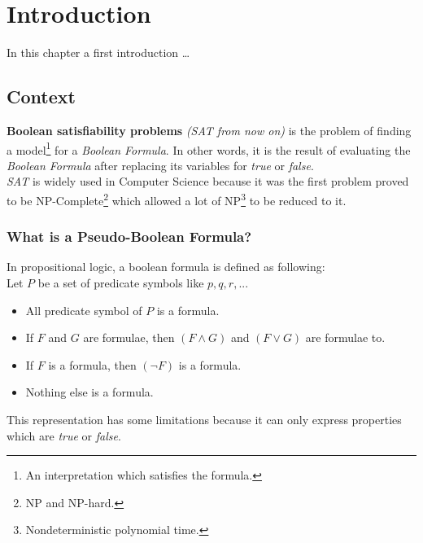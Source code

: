 \chapter{Introduction} %

\label{Chapter1} %

In this chapter a first introduction \ldots

\section{Context}

\textbf{Boolean satisfiability problems} \textit{(SAT from now on)} is the problem of finding a model\footnote{An interpretation which satisfies the formula.} for a \emph{Boolean Formula}. In other words, it is the result of evaluating the \emph{Boolean Formula} after replacing its variables for \emph{true} or \emph{false}. 
\\
\emph{SAT} is widely used in Computer Science because it was the first problem proved to be NP-Complete\cite{Cook1971}\footnote{NP and NP-hard.} which allowed a lot of NP\footnote{Nondeterministic polynomial time.} to be reduced to it.

\subsection{What is a Pseudo-Boolean Formula?}
In propositional logic, a boolean formula is defined as following\cite{Lpo}:\\
Let $P$ be a set of predicate symbols like $p,q,r,...$
\begin{itemize}
	\item All predicate symbol of $P$ is a formula.
	\item If $F$ and $G$ are formulae, then $(F \land G)$ and $(F \lor G)$ are formulae to.
	\item If $F$ is a formula, then $(\neg F)$ is a formula.
	\item Nothing else is a formula.
\end{itemize}
This representation has some limitations because it can only express properties which are \emph{true} or \emph{false}.\\

